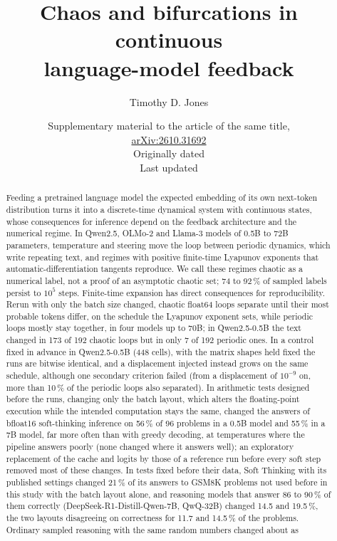 \documentclass[11pt,letterpaper]{article}
\title{Chaos and bifurcations in continuous\\ language-model feedback}
\author{Timothy D. Jones}
\date{Supplementary material to the article of the same title,\\
  \href{https://arxiv.org/abs/2610.31692}{arXiv:2610.31692}\\[0.5em]
  \small Originally dated \originaldate\\
  \small Last updated \revisiondate}
\begin{document}
\maketitle
\begin{abstract}
Feeding a pretrained language model the expected embedding of its own next-token distribution turns it into a
discrete-time dynamical system with continuous states, whose consequences for inference depend on the feedback
architecture and the numerical regime. In Qwen2.5, OLMo-2 and Llama-3 models of 0.5B to 72B parameters, temperature and
steering move the loop between periodic dynamics, which write repeating text, and regimes with positive finite-time
Lyapunov exponents that automatic-differentiation tangents reproduce. We call these regimes chaotic as a numerical
label, not a proof of an asymptotic chaotic set; 74 to 92\,\% of sampled labels persist to $10^5$ steps. Finite-time
expansion has direct consequences for reproducibility. Rerun with only the batch size changed, chaotic float64 loops
separate until their most probable tokens differ, on the schedule the Lyapunov exponent sets, while periodic loops
mostly stay together, in four models up to 70B; in Qwen2.5-0.5B the text changed in 173 of 192 chaotic loops but in
only 7 of 192 periodic ones. In a control fixed in advance in Qwen2.5-0.5B (448 cells), with
the matrix shapes held fixed the runs are bitwise identical, and a displacement injected instead grows on the same
schedule, although one secondary criterion failed (from a displacement of $10^{-9}$ on, more than 10\,\% of the
periodic loops also separated). In arithmetic tests designed before the runs, changing only the batch
layout, which alters the floating-point execution while the intended computation stays the same, changed the answers
of bfloat16 soft-thinking inference on 56\,\% of 96 problems in a 0.5B model and 55\,\% in a 7B model, far more often
than with greedy decoding, at temperatures where the pipeline answers poorly (none changed where it answers well); an
exploratory replacement of the cache and logits by those of a reference run before every soft step removed most of these changes. In
tests fixed before their data, Soft Thinking with its published settings changed 21\,\% of its answers to GSM8K
problems not used before in this study with the batch layout alone, and reasoning models that answer 86 to 90\,\% of
them correctly (DeepSeek-R1-Distill-Qwen-7B, QwQ-32B) changed 14.5 and 19.5\,\%, the two layouts disagreeing on
correctness for 11.7 and 14.5\,\% of the problems. Ordinary sampled reasoning with the same random numbers changed about as

\end{abstract}
\end{document}
